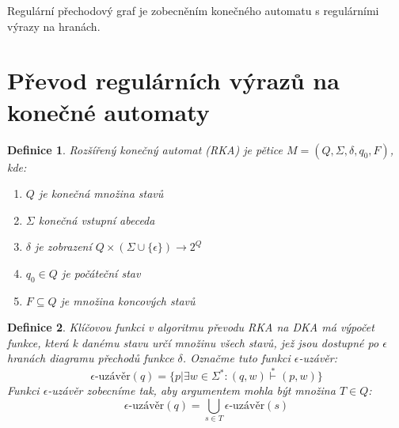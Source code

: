 \documentclass[a4paper, 11pt]{report}
\newtheorem{mydef}{Definice}[chapter]
\begin{document}
Regulární přechodový graf je zobecněním konečného automatu s regulárními výrazy na hranách.

\section{Převod regulárních výrazů na konečné automaty}

\begin{mydef}
\emph{Rozšířený konečný automat} (RKA) je pětice $M=(Q, \Sigma, \delta, q_0, F)$, kde:
\begin{enumerate}
	\item $Q$ je konečná množina stavů
	\item $\Sigma$ konečná vstupní abeceda
	\item $\delta$ je zobrazení $Q \times (\Sigma \cup \{\epsilon\}) \to 2^Q$
	\item $q_0 \in Q$ je počáteční stav
	\item $F \subseteq Q$ je množina koncových stavů
\end{enumerate}
\end{mydef}

\begin{mydef}
Klíčovou funkci v algoritmu převodu RKA na DKA má výpočet funkce, která k danému stavu určí množinu všech stavů, jež jsou dostupné po $\epsilon$ hranách diagramu přechodů funkce $\delta$. Označme tuto funkci $\epsilon$-uzávěr:
$$\epsilon\text{-uzávěr}(q) = \{p | \exists w \in \Sigma^*: (q, w) \overset{*}{\vdash} (p, w)\}$$
Funkci $\epsilon$-uzávěr zobecníme tak, aby argumentem mohla být množina $T \in Q$:
$$\epsilon\text{-uzávěr}(q) = \bigcup\limits_{s \in T} \epsilon\text{-uzávěr}(s)$$
\end{mydef}
\end{document}
